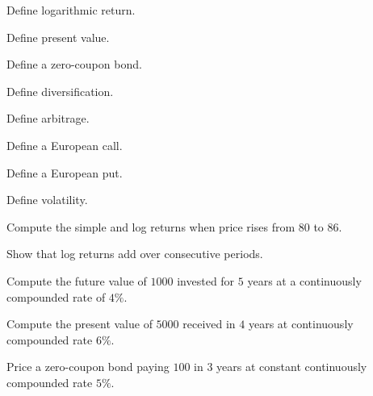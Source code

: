\begin{exercise}[1]
Define logarithmic return.
\end{exercise}

\begin{exercise}[1]
Define present value.
\end{exercise}

\begin{exercise}[1]
Define a zero-coupon bond.
\end{exercise}

\begin{exercise}[1]
Define diversification.
\end{exercise}

\begin{exercise}[1]
Define arbitrage.
\end{exercise}

\begin{exercise}[1]
Define a European call.
\end{exercise}

\begin{exercise}[1]
Define a European put.
\end{exercise}

\begin{exercise}[1]
Define volatility.
\end{exercise}

\begin{exercise}[2]
Compute the simple and log returns when price rises from \(80\) to \(86\).
\end{exercise}

\begin{exercise}[2]
Show that log returns add over consecutive periods.
\end{exercise}

\begin{exercise}[2]
Compute the future value of \(1000\) invested for \(5\) years at a
continuously compounded rate of \(4\%\).
\end{exercise}

\begin{exercise}[2]
Compute the present value of \(5000\) received in \(4\) years at
continuously compounded rate \(6\%\).
\end{exercise}

\begin{exercise}[2]
Price a zero-coupon bond paying \(100\) in \(3\) years at constant
continuously compounded rate \(5\%\).
\end{exercise}

